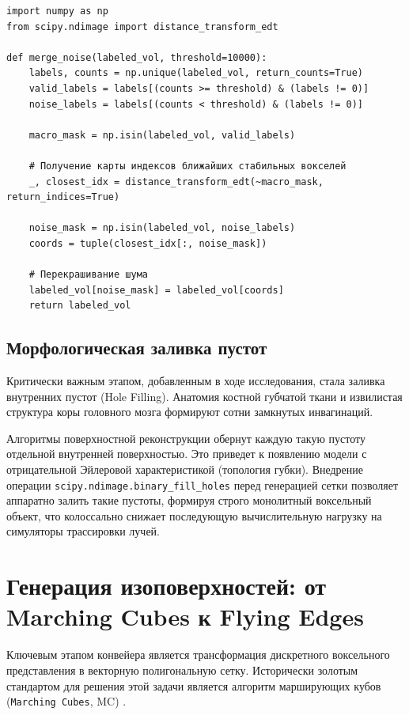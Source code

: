 \documentclass[a4paper,14pt]{article}
\begin{document}
\begin{lstlisting}[caption={Реализация фильтрации через \texttt{distance\_transform\_edt}}]
import numpy as np
from scipy.ndimage import distance_transform_edt

def merge_noise(labeled_vol, threshold=10000):
    labels, counts = np.unique(labeled_vol, return_counts=True)
    valid_labels = labels[(counts >= threshold) & (labels != 0)]
    noise_labels = labels[(counts < threshold) & (labels != 0)]
    
    macro_mask = np.isin(labeled_vol, valid_labels)
    
    # Получение карты индексов ближайших стабильных вокселей
    _, closest_idx = distance_transform_edt(~macro_mask, return_indices=True)
    
    noise_mask = np.isin(labeled_vol, noise_labels)
    coords = tuple(closest_idx[:, noise_mask])
    
    # Перекрашивание шума
    labeled_vol[noise_mask] = labeled_vol[coords]
    return labeled_vol
\end{lstlisting}

\subsection{Морфологическая заливка пустот}
Критически важным этапом, добавленным в ходе исследования, стала заливка внутренних пустот (Hole Filling). Анатомия костной губчатой ткани и извилистая структура коры головного мозга формируют сотни замкнутых инвагинаций. 

Алгоритмы поверхностной реконструкции обернут каждую такую пустоту отдельной внутренней поверхностью. Это приведет к появлению модели с отрицательной Эйлеровой характеристикой (топология губки). Внедрение операции \texttt{scipy.ndimage.binary\_fill\_holes} перед генерацией сетки позволяет аппаратно залить такие пустоты, формируя строго монолитный воксельный объект, что колоссально снижает последующую вычислительную нагрузку на симуляторы трассировки лучей.

\newpage
\section{Генерация изоповерхностей: от Marching Cubes к Flying Edges}

Ключевым этапом конвейера является трансформация дискретного воксельного представления в векторную полигональную сетку. Исторически золотым стандартом для решения этой задачи является алгоритм марширующих кубов (\texttt{Marching Cubes}, MC) \cite{lorensen1987}.
\end{document}
